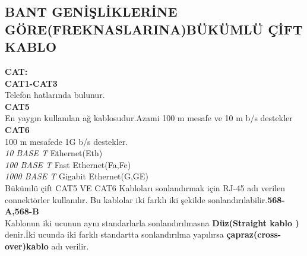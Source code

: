 \subsection{BANT GENİŞLİKLERİNE GÖRE(FREKNASLARINA)BÜKÜMLÜ ÇİFT KABLO}
\textbf{CAT:}\\
\textbf{CAT1-CAT3} \\
Telefon hatlarında bulunur.\\
\textbf{CAT5} \\
En yaygın kullanılan ağ kablosudur.Azami 100 m mesafe ve 10 m b/s destekler\\
\textbf{CAT6} \\
100 m mesafede 1G b/s destekler.\\
\textit{10 BASE T} Ethernet(Eth)\\
\textit{100 BASE T} Fast Ethernet(Fa,Fe)\\
\textit{1000 BASE T} Gigabit Ethernet(G,GE)\\
Bükümlü çift CAT5 VE CAT6 Kabloları  sonlandırmak için RJ-45 adı verilen connektörler kullanılır.
Bu kablolar iki farklı iki şekilde sonlandırılabilir.\textbf{568-A,568-B}\\
Kablonun iki ucunun aynı standarlarla sonlandırılmasna \textbf{Düz(Straight kablo )} denir.İki ucunda iki farklı standartta sonlandırılma yapılırsa \textbf{çapraz(cross-over)kablo } adı verilir.